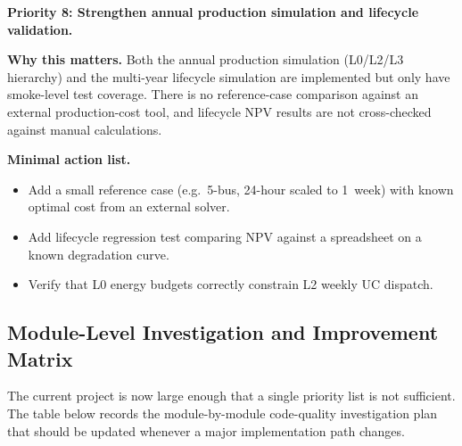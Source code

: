 \textbf{Priority 8: Strengthen annual production simulation and lifecycle
validation.}

\textbf{Why this matters.}  Both the annual production simulation (L0/L2/L3
hierarchy) and the multi-year lifecycle simulation are implemented but only
have smoke-level test coverage.  There is no reference-case comparison
against an external production-cost tool, and lifecycle NPV results are not
cross-checked against manual calculations.

\textbf{Minimal action list.}
\begin{itemize}
  \item Add a small reference case (e.g.\ 5-bus, 24-hour scaled to 1~week) with known optimal cost from an external solver.
  \item Add lifecycle regression test comparing NPV against a spreadsheet on a known degradation curve.
  \item Verify that L0 energy budgets correctly constrain L2 weekly UC dispatch.
\end{itemize}

\subsection{Module-Level Investigation and Improvement Matrix}

The current project is now large enough that a single priority list is not
sufficient.  The table below records the module-by-module code-quality
investigation plan that should be updated whenever a major implementation path
changes.

